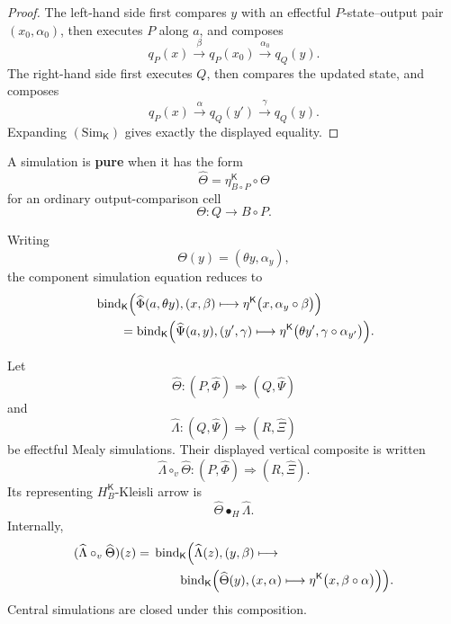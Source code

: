 \begin{proof}
The left-hand side first compares \(y\) with an effectful
\(P\)-state--output pair \((x_0,\alpha_0)\), then executes \(P\) along \(a\),
and composes
\[
    q_P(x)
    \xrightarrow{\beta}
    q_P(x_0)
    \xrightarrow{\alpha_0}
    q_Q(y).
\]
The right-hand side first executes \(Q\), then compares the updated state,
and composes
\[
    q_P(x)
    \xrightarrow{\alpha}
    q_Q(y')
    \xrightarrow{\gamma}
    q_Q(y).
\]
Expanding \((\mathrm{Sim}_{\mathsf K})\) gives exactly the displayed equality.
\end{proof}

\begin{definition}
\label{def:pure-effectful-simulation}
A simulation is \textbf{pure} when it has the form
\[
    \widehat\Theta
    =
    \eta^{\mathsf K}_{B\circ P}\circ\Theta
\]
for an ordinary output-comparison cell
\[
    \Theta:Q\longrightarrow B\circ P.
\]
\end{definition}

Writing
\[
    \Theta(y)
    =
    (\theta y,\alpha_y),
\]
the component simulation equation reduces to
\[
\begin{aligned}
&
\operatorname{bind}_{\mathsf K}
\Bigl(
    \widehat\Phi(a,\theta y),
    (x,\beta)
    \longmapsto
    \eta^{\mathsf K}
    \bigl(
        x,
        \alpha_y\circ\beta
    \bigr)
\Bigr)
\\
&\qquad=
\operatorname{bind}_{\mathsf K}
\Bigl(
    \widehat\Psi(a,y),
    (y',\gamma)
    \longmapsto
    \eta^{\mathsf K}
    \bigl(
        \theta y',
        \gamma\circ\alpha_{y'}
    \bigr)
\Bigr).
\end{aligned}
\]

\begin{proposition}
\label{prop:vertical-composition-effectful-simulations}
Let
\[
    \widehat\Theta:
    (P,\widehat\Phi)
    \Rightarrow
    (Q,\widehat\Psi)
\]
and
\[
    \widehat\Lambda:
    (Q,\widehat\Psi)
    \Rightarrow
    (R,\widehat\Xi)
\]
be effectful Mealy simulations.  Their displayed vertical composite is
written
\[
    \widehat\Lambda\circ_v\widehat\Theta:
    (P,\widehat\Phi)
    \Rightarrow
    (R,\widehat\Xi).
\]
Its representing \(H_B^{\mathsf K}\)-Kleisli arrow is
\[
    \widehat\Theta\mathbin{\bullet_H}\widehat\Lambda.
\]
Internally,
\[
\begin{aligned}
    (\widehat\Lambda\circ_v\widehat\Theta)(z)
    ={}&
    \operatorname{bind}_{\mathsf K}
    \Bigl(
        \widehat\Lambda(z),
        (y,\beta)
        \longmapsto
    \\
    &\qquad
        \operatorname{bind}_{\mathsf K}
        \Bigl(
            \widehat\Theta(y),
            (x,\alpha)
            \longmapsto
            \eta^{\mathsf K}
            \bigl(
                x,
                \beta\circ\alpha
            \bigr)
        \Bigr)
    \Bigr).
\end{aligned}
\]
Central simulations are closed under this composition.
\end{proposition}

